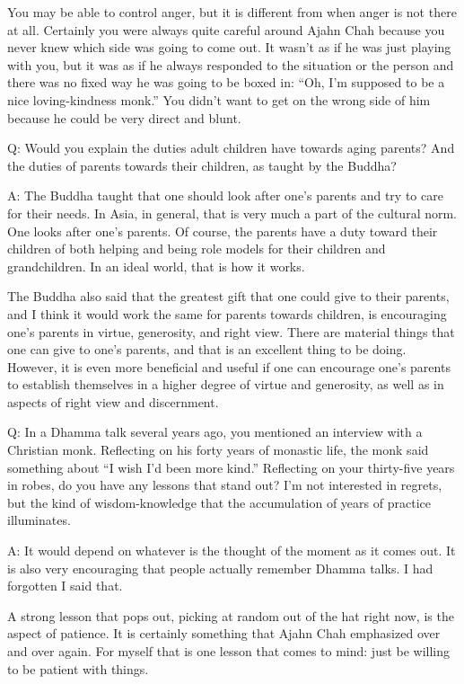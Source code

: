 You may be able to control anger, but it is different from when anger is
not there at all. Certainly you were always quite careful around Ajahn
Chah because you never knew which side was going to come out. It wasn’t
as if he was just playing with you, but it was as if he always responded
to the situation or the person and there was no fixed way he was going
to be boxed in: “Oh, I’m supposed to be a nice loving-kindness monk.”
You didn’t want to get on the wrong side of him because he could be very
direct and blunt.

\qaspace
Q: Would you explain the duties adult children have towards aging
parents? And the duties of parents towards their children, as taught by
the Buddha?

\qaspace
A: The Buddha taught that one should look after one’s parents and try to
care for their needs. In Asia, in general, that is very much a part of
the cultural norm. One looks after one’s parents. Of course, the parents
have a duty toward their children of both helping and being role models
for their children and grandchildren. In an ideal world, that is how it
works.

The Buddha also said that the greatest gift that one could give to their
parents, and I think it would work the same for parents towards
children, is encouraging one’s parents in virtue, generosity, and right
view. There are material things that one can give to one’s parents, and
that is an excellent thing to be doing. However, it is even more
beneficial and useful if one can encourage one’s parents to establish
themselves in a higher degree of virtue and generosity, as well as in
aspects of right view and discernment.

\qaspace
Q: In a Dhamma talk several years ago, you mentioned an interview with a
Christian monk. Reflecting on his forty years of monastic life, the monk
said something about “I wish I’d been more kind.” Reflecting on your
thirty-five years in robes, do you have any lessons that stand out? I’m
not interested in regrets, but the kind of wisdom-knowledge that the
accumulation of years of practice illuminates.

\qaspace
A: It would depend on whatever is the thought of the moment as it comes
out. It is also very encouraging that people actually remember Dhamma
talks. I had forgotten I said that.

A strong lesson that pops out, picking at random out of the hat right
now, is the aspect of patience. It is certainly something that Ajahn
Chah emphasized over and over again. For myself that is one lesson that
comes to mind: just be willing to be patient with things.

